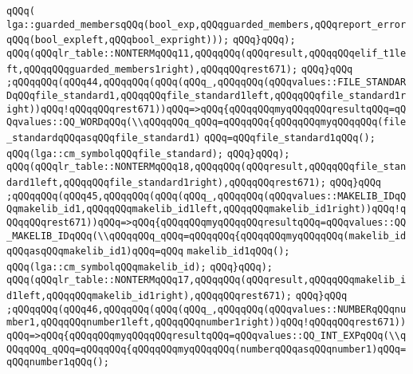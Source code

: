 \verb|qQQq(|\newline
\verb|lga::guarded_membersqQQq(bool_exp,qQQqguarded_members,qQQqreport_errorqQQq(bool_expleft,qQQqbool_expright)));|\newline
\verb|qQQq}qQQq);|\newline
\verb|qQQq(qQQqlr_table::NONTERMqQQq11,qQQqqQQq(qQQqresult,qQQqqQQqelif_t1left,qQQqqQQqguarded_members1right),qQQqqQQqrest671);|\newline
\verb|qQQq}qQQq|\newline
\verb|;qQQqqQQq(qQQq44,qQQqqQQq(qQQq(qQQq_,qQQqqQQq(qQQqvalues::FILE_STANDARDqQQqfile_standard1,qQQqqQQqfile_standard1left,qQQqqQQqfile_standard1right))qQQq!qQQqqQQqrest671))qQQq=>qQQq{qQQqqQQqmyqQQqqQQqresultqQQq=qQQqvalues::QQ_WORDqQQq(\\qQQqqQQq_qQQq=qQQqqQQq{qQQqqQQqmyqQQqqQQq(file_standardqQQqasqQQqfile_standard1)|\newline
\verb|qQQq=qQQqfile_standard1qQQq();|\newline
\verb|qQQq(lga::cm_symbolqQQqfile_standard);|\newline
\verb|qQQq}qQQq);|\newline
\verb|qQQq(qQQqlr_table::NONTERMqQQq18,qQQqqQQq(qQQqresult,qQQqqQQqfile_standard1left,qQQqqQQqfile_standard1right),qQQqqQQqrest671);|\newline
\verb|qQQq}qQQq|\newline
\verb|;qQQqqQQq(qQQq45,qQQqqQQq(qQQq(qQQq_,qQQqqQQq(qQQqvalues::MAKELIB_IDqQQqmakelib_id1,qQQqqQQqmakelib_id1left,qQQqqQQqmakelib_id1right))qQQq!qQQqqQQqrest671))qQQq=>qQQq{qQQqqQQqmyqQQqqQQqresultqQQq=qQQqvalues::QQ_MAKELIB_IDqQQq(\\qQQqqQQq_qQQq=qQQqqQQq{qQQqqQQqmyqQQqqQQq(makelib_idqQQqasqQQqmakelib_id1)qQQq=qQQq|\newline
\verb|makelib_id1qQQq();|\newline
\verb|qQQq(lga::cm_symbolqQQqmakelib_id);|\newline
\verb|qQQq}qQQq);|\newline
\verb|qQQq(qQQqlr_table::NONTERMqQQq17,qQQqqQQq(qQQqresult,qQQqqQQqmakelib_id1left,qQQqqQQqmakelib_id1right),qQQqqQQqrest671);|\newline
\verb|qQQq}qQQq|\newline
\verb|;qQQqqQQq(qQQq46,qQQqqQQq(qQQq(qQQq_,qQQqqQQq(qQQqvalues::NUMBERqQQqnumber1,qQQqqQQqnumber1left,qQQqqQQqnumber1right))qQQq!qQQqqQQqrest671))qQQq=>qQQq{qQQqqQQqmyqQQqqQQqresultqQQq=qQQqvalues::QQ_INT_EXPqQQq(\\qQQqqQQq_qQQq=qQQqqQQq{qQQqqQQqmyqQQqqQQq(numberqQQqasqQQqnumber1)qQQq=qQQqnumber1qQQq();|\newline
